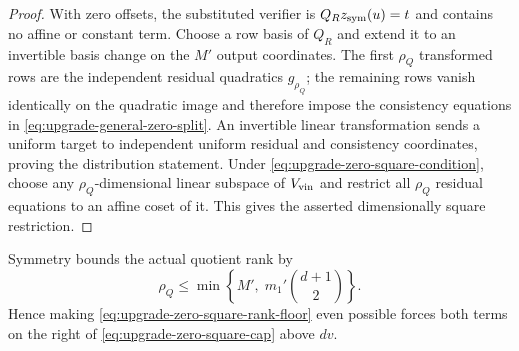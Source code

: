 \documentclass[11pt]{article}
\begin{document}
\begin{proof}
With zero offsets, the substituted verifier is $Q_Rz_{\rm sym}(u)=t$ and
contains no affine or constant term.  Choose a row basis of $Q_R$ and extend
it to an invertible basis change on the $M'$ output coordinates.  The first
$\rho_Q$ transformed rows are the independent residual quadratics
$g_{\rho_Q}$; the remaining rows vanish identically on the quadratic image and
therefore impose the consistency equations in
\eqref{eq:upgrade-general-zero-split}.  An invertible linear transformation
sends a uniform target to independent uniform residual and consistency
coordinates, proving the distribution statement.  Under
\eqref{eq:upgrade-zero-square-condition}, choose any $\rho_Q$-dimensional
linear subspace of $V_{\rm vin}$ and restrict all $\rho_Q$ residual equations
to an affine coset of it.  This gives the asserted dimensionally square
restriction.
\end{proof}

Symmetry bounds the actual quotient rank by
\begin{equation}
 \rho_Q\le \min\left\{M',\;m_1'\binom{d+1}{2}\right\}.
                                                               \label{eq:upgrade-zero-square-cap}
\end{equation}
Hence making \eqref{eq:upgrade-zero-square-rank-floor} even possible forces
both terms on the right of \eqref{eq:upgrade-zero-square-cap} above $dv$.
\end{document}
